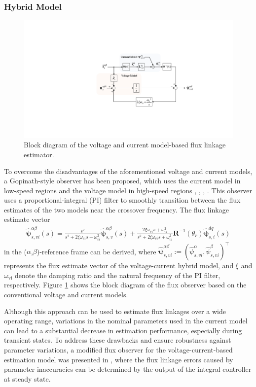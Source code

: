 \subsubsection{Hybrid Model}\begin{figure}[t]
    \centering
\includegraphics[scale=0.8]{chapters/Fig2.9.pdf}
    \caption{Block diagram of the voltage and current model-based flux linkage estimator.}
    \label{Fig:2.9}
\end{figure}
To overcome the disadvantages of the aforementioned voltage and current models, a Gopinath-style observer has been proposed, which uses the current model in low-speed regions and the voltage model in high-speed regions \cite{c2.3_11}, \cite{c2.3_12}, \cite{c2.3_13}, \cite{c2.3_14}. This observer uses a proportional-integral (PI) filter to smoothly transition between the flux estimates of the two models near the crossover frequency. The flux linkage estimate vector
\begin{align}\label{eqn:2.32}
\bm{\hat{\psi}}^{\alpha\beta}_{s,{vi}}(s)
=
\frac{s^2}{s^2 + 2 \xi \omega_{vi} s + \omega_{vi}^2}\bm{\hat{\psi}}^{\alpha\beta}_{s,v}(s) +
\frac{2 \xi \omega_{vi} s + \omega_{vi}^2}{s^2 + 2 \xi \omega_{vi} s + \omega_{vi}^2}\bm{R}^{-1}(\theta_r)\bm{\hat{\psi}}^{dq}_{s,i}(s)
\end{align}
in the ($\alpha$,$\beta$)-reference frame can be derived, where \(\bm{\hat{\psi}}^{\alpha\beta}_{s,{vi}}:=(\hat{\psi}^{\alpha}_{s,{vi}},\hat{\psi}^{\beta}_{s,{vi}})^\top\) represents the flux estimate vector of the voltage-current hybrid model, and \(\xi\) and \(\omega_{\text{vi}}\) denote the damping ratio and the natural frequency of the PI filter, respectively. Figure \ref{Fig:2.9} shows the block diagram of the flux observer based on the conventional voltage and current models.

Although this approach can be used to estimate flux linkages over a wide operating range, variations in the nominal parameters used in the current model can lead to a substantial decrease in estimation performance, especially during transient states. To address these drawbacks and ensure robustness against parameter variations, a modified flux observer for the voltage-current-based estimation model was presented in \cite{c2.3_15}, where the flux linkage errors caused by parameter inaccuracies can be determined by the output of the integral controller at steady state. 

